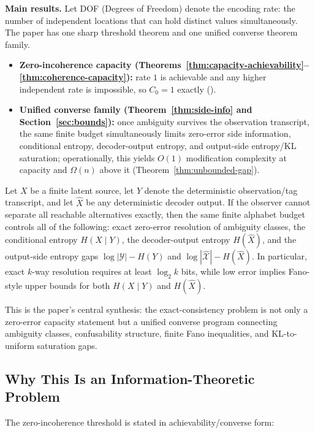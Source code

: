 \textbf{Main results.} Let DOF (Degrees of Freedom) denote the encoding rate: the number of independent locations that can hold distinct values simultaneously. The paper has one sharp threshold theorem and one unified converse theorem family.
\begin{itemize}
\tightlist
\item \textbf{Zero-incoherence capacity (Theorems~\ref{thm:capacity-achievability}--\ref{thm:coherence-capacity}):} rate $1$ is achievable and any higher independent rate is impossible, so $C_0=1$ exactly ().
\item \textbf{Unified converse family (Theorem~\ref{thm:side-info} and Section~\ref{sec:bounds}):} once ambiguity survives the observation transcript, the same finite budget simultaneously limits zero-error side information, conditional entropy, decoder-output entropy, and output-side entropy/KL saturation; operationally, this yields $O(1)$ modification complexity at capacity and $\Omega(n)$ above it (Theorem~\ref{thm:unbounded-gap}).
\end{itemize}

\begin{theorem}
Let $X$ be a finite latent source, let $Y$ denote the deterministic observation/tag transcript, and let $\hat X$ be any deterministic decoder output. If the observer cannot separate all reachable alternatives exactly, then the same finite alphabet budget controls all of the following: exact zero-error resolution of ambiguity classes, the conditional entropy $H(X\mid Y)$, the decoder-output entropy $H(\hat X)$, and the output-side entropy gaps $\log |\mathcal Y|-H(Y)$ and $\log |\hat{\mathcal X}|-H(\hat X)$. In particular, exact $k$-way resolution requires at least $\log_2 k$ bits, while low error implies Fano-style upper bounds for both $H(X\mid Y)$ and $H(\hat X)$.
\end{theorem}

This is the paper's central synthesis: the exact-consistency problem is not only a zero-error capacity statement but a unified converse program connecting ambiguity classes, confusability structure, finite Fano inequalities, and KL-to-uniform saturation gaps.

\subsection{Why This Is an Information-Theoretic Problem}\label{sec:optimal-rate}

The zero-incoherence threshold is stated in achievability/converse form:

